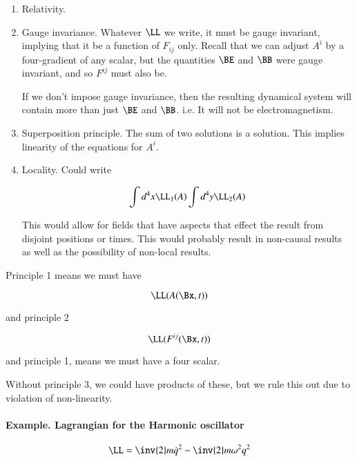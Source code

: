 \begin{enumerate}
\item Relativity.
\item Gauge invariance.  Whatever $\LL$ we write, it must be gauge invariant, implying that it be a function of $F_{ij}$ only.  Recall that we can adjust $A^i$ by a four-gradient of any scalar, but the quantities $\BE$ and $\BB$ were gauge invariant, and so $F^{ij}$ must also be.

If we don't impose gauge invariance, then the resulting dynamical system will contain more than just $\BE$ and $\BB$.  i.e. It will not be electromagnetism.

\item Superposition principle.  The sum of two solutions is a solution.  This implies linearity of the equations for $A^i$.

\item Locality.  Could write

\begin{equation}\label{eqn:relativisticElectrodynamicsL12:210}
\int d^4 x \LL_1(A) \int d^4 y \LL_2(A)
\end{equation}

This would allow for fields that have aspects that effect the result from disjoint positions or times.  This would probably result in non-causal results as well as the possibility of non-local results.
\end{enumerate}

Principle 1 means we must have 

\begin{equation}\label{eqn:relativisticElectrodynamicsL12:230}
\LL(A(\Bx, t))
\end{equation}

and principle 2

\begin{equation}\label{eqn:relativisticElectrodynamicsL12:250}
\LL(F^{ij}(\Bx, t))
\end{equation}

and principle 1, means we must have a four scalar.

Without principle 3, we could have products of these, but we rule this out due to violation of non-linearity.

\paragraph{Example.  Lagrangian for the Harmonic oscillator}

\begin{equation}\label{eqn:relativisticElectrodynamicsL12:270}
\LL = \inv{2} m \dot{q}^2 - \inv{2} m \omega^2 q^2 
\end{equation}


